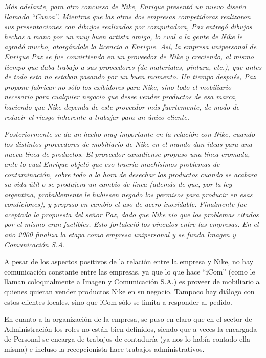 \documentclass[a4paper,10pt,titlepage]{article}
\begin{document}
\begin{itemize}
\textit{M\'as adelante, para otro concurso de Nike, Enrique present\'o un nuevo diseño llamado ``Canoa''.
Mientras que las otras dos empresas competidoras realizaron sus presentaciones con dibujos realizados por computadora, Paz entreg\'o dibujos hechos a mano por un muy buen artista amigo, lo cual a la gente de Nike le agrad\'o mucho, otorg\'andole la licencia a Enrique.
As\'i, la empresa unipersonal de Enrique Paz se fue convirtiendo en un proveedor de Nike y creciendo, al mismo tiempo que daba trabajo a sus proveedores (de materiales, pintura, etc.), que antes de todo esto no estaban pasando por un buen momento.
Un tiempo despu\'es, Paz propone fabricar no s\'olo los exibidores para Nike, sino todo el mobiliario necesario para cualquier negocio que desee vender productos de esa marca, haciendo que Nike dependa de este proveedor m\'as fuertemente, de modo de reducir el riesgo inherente a trabajar para un \'unico cliente.}

\textit{Posteriormente se da un hecho muy importante en la relaci\'on con Nike, cuando los distintos proveedores de mobiliario de Nike en el mundo dan ideas para una nueva l\'inea de productos.
El proveedor canadiense propuso una l\'inea cromada, ante lo cual Enrique objet\'o que eso traer\'ia much\'isimos problemas de contaminaci\'on, sobre todo a la hora de desechar los productos cuando se acabara su vida \'util o se produjera un cambio de l\'inea (adem\'as de que, por la ley argentina, probablemente le hubiesen negado los permisos para producir en esas condiciones), y propuso en cambio el uso de acero inoxidable.
Finalmente fue aceptada la propuesta del señor Paz, dado que Nike vio que los problemas citados por el mismo eran factibles. Esto fortaleci\'o los v\'inculos entre las empresas. En el año 2000 finaliza la etapa como empresa unipersonal y se funda Imagen y Comunicaci\'on S.A.}

A pesar de los aspectos positivos de la relaci\'on entre la empresa y Nike, no hay comunicaci\'on constante entre las empresas, ya que lo que hace ``iCom'' (como le llaman coloquialmente a Imagen y Comunicaci\'on S.A.) es proveer de mobiliario a quienes quieran vender productos Nike en su negocio. Tampoco hay di\'alogo con estos clientes locales, sino que iCom s\'olo se limita a responder al pedido.

En cuanto a la organizaci\'on de la empresa, se puso en claro que en el sector de Administraci\'on los roles no est\'an bien definidos, siendo que a veces la encargada de Personal se encarga de trabajos de contadur\'ia (ya nos lo hab\'ia contado ella misma) e incluso la recepcionista hace trabajos administrativos. 


\end{itemize}
\end{document}
